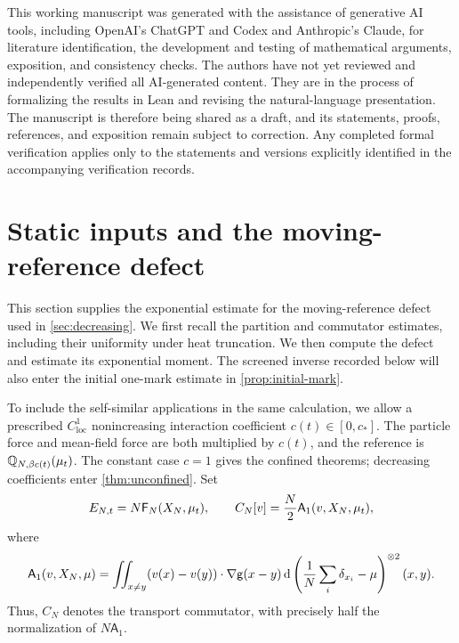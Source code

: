 \documentclass[11pt,reqno]{amsart}
\numberwithin{equation}{section}
\theoremstyle{plain}
\theoremstyle{remark}
\begin{document}
This working manuscript was generated with the assistance of generative AI tools, including OpenAI's ChatGPT and Codex and Anthropic's Claude, for literature identification, the development and testing of mathematical arguments, exposition, and consistency checks. The authors have not yet reviewed and independently verified all AI-generated content. They are in the process of formalizing the results in Lean and revising the natural-language presentation. The manuscript is therefore being shared as a draft, and its statements, proofs, references, and exposition remain subject to correction. Any completed formal verification applies only to the statements and versions explicitly identified in the accompanying verification records.


\par\endgroup

\begingroup

\clearpage
\section{Static inputs and the moving-reference defect}\label{sec:static}

This section supplies the exponential estimate for the moving-reference defect used in \cref{sec:decreasing}. We first recall the partition and commutator estimates, including their uniformity under heat truncation. We then compute the defect and estimate its exponential moment. The screened inverse recorded below will also enter the initial one-mark estimate in \cref{prop:initial-mark}.

To include the self-similar applications in the same calculation, we allow a prescribed $C_{\mathrm{loc}}^1$ nonincreasing interaction coefficient $c(t)\in[0,c_*]$. The particle force and mean-field force are both multiplied by $c(t)$, and the reference is $\mathbb Q_{N,\beta c(t)}(\mu_t)$. The constant case $c=1$ gives the confined theorems; decreasing coefficients enter \cref{thm:unconfined}. Set
\begin{equation}\label{eq:energy-short}
 E_{N,t}=N\mathsf F_N(X_N,\mu_t),\qquad C_N[v]=\frac N2\mathsf A_1(v,X_N,\mu_t),
\end{equation}
where
\begin{equation}\label{eq:A1}
 \mathsf A_1(v,X_N,\mu)=\iint_{x\ne y}(v(x)-v(y))\cdot\nabla\mathsf g(x-y)
 \,\mathrm d\left(\frac1N\sum_i\delta_{x_i}-\mu\right)^{\otimes2}(x,y).
\end{equation}
Thus, $C_N$ denotes the transport commutator, with precisely half the normalization of $N\mathsf A_1$.
\end{document}
